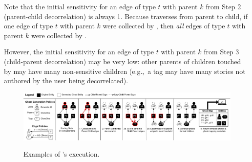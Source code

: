Note that the initial sensitivity for an edge of type $t$ with parent $k$ from Step 2 (parent-child
decorrelation) is always 1. Because \sys traverses from parent to child, if one edge of type $t$ with
parent $k$ were collected by \sys, then \emph{all} edges of type $t$ with parent $k$ were collected
by \sys. 

However, the initial sensitivity for an edge of type $t$ with parent $k$ from Step 3 (child-parent
decorrelation) may be very low: other parents of children touched by \sys may have many
non-sensitive children (e.g.,\ a tag may have many stories not authored by the user being
decorrelated).

\begin{figure}[t!]
    \includegraphics[width=.5\textwidth]{img/algo}
    \label{fig:algo}
    \caption{Examples of \sys's execution.}
\end{figure}

%
